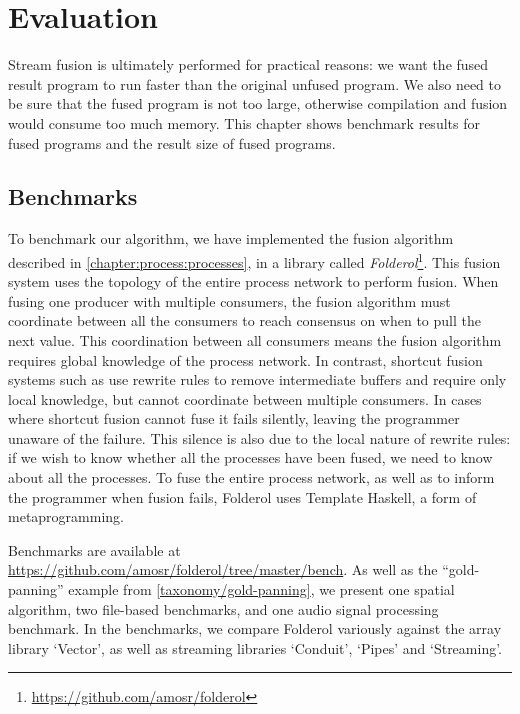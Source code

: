 \chapter{Evaluation}
\label{s:Benchmarks}
Stream fusion is ultimately performed for practical reasons: we want the fused result program to run faster than the original unfused program.
We also need to be sure that the fused program is not too large, otherwise compilation and fusion would consume too much memory.
This chapter shows benchmark results for fused programs and the result size of fused programs.

\section{Benchmarks}

To benchmark our algorithm, we have implemented the fusion algorithm described in \cref{chapter:process:processes}, in a library called \emph{Folderol}\footnote{\url{https://github.com/amosr/folderol}}.
This fusion system uses the topology of the entire process network to perform fusion.
When fusing one producer with multiple consumers, the fusion algorithm must coordinate between all the consumers to reach consensus on when to pull the next value.
This coordination between all consumers means the fusion algorithm requires global knowledge of the process network.
In contrast, shortcut fusion systems such as \cite{gill1993short} use rewrite rules to remove intermediate buffers and require only local knowledge, but cannot coordinate between multiple consumers.
In cases where shortcut fusion cannot fuse it fails silently, leaving the programmer unaware of the failure.
This silence is also due to the local nature of rewrite rules: if we wish to know whether all the processes have been fused, we need to know about all the processes.
To fuse the entire process network, as well as to inform the programmer when fusion fails, Folderol uses Template Haskell, a form of metaprogramming.

Benchmarks are available at \url{https://github.com/amosr/folderol/tree/master/bench}.
As well as the ``gold-panning'' example from \cref{taxonomy/gold-panning}, we present one spatial algorithm, two file-based benchmarks, and one audio signal processing benchmark.
In the benchmarks, we compare Folderol variously against the array library `Vector', as well as streaming libraries `Conduit', `Pipes' and `Streaming'.

